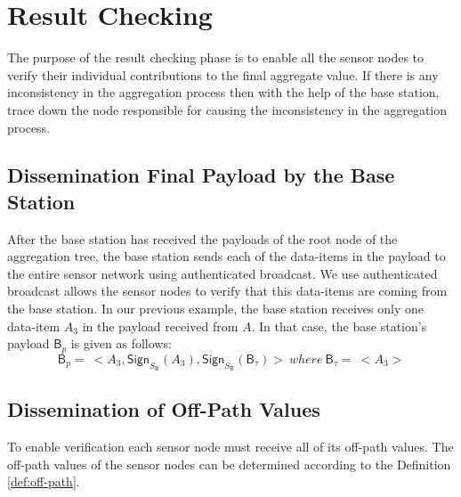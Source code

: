 \section{Result Checking}
	The purpose of the result checking phase is to enable all the sensor nodes to verify their individual contributions to the final aggregate value.
	If there is any inconsistency in the aggregation process then with the help of the base station, trace down the node responsible for causing the inconsistency in the aggregation process.

	\subsection{Dissemination Final Payload by the Base Station}
		After the base station has received the payloads of the root node of the aggregation tree, the base station sends each of the data-items in the payload to the entire sensor network using authenticated broadcast.
		We use authenticated broadcast allows the sensor nodes to verify that this data-items are coming from the base station.
		In our previous example, the base station receives only one data-item $A_{3}$ in the payload received from $A$.
		In that case, the base station's payload $\textsf{B}_{p}$ is given as follows:
 		\begin{equation}
			\textsf{B}_{p} =\ <A_{3}, \textsf{Sign}_{S_{\textsf{B}}}(A_{3}), \textsf{Sign}_{S_{\textsf{B}}}(\textsf{B}_{\tau})>\ where\ \textsf{B}_{\tau} =\ <A_{3}>
		\end{equation}

	\subsection{Dissemination of Off-Path Values}
		To enable verification each sensor node must receive all of its off-path values.
		The off-path values of the sensor nodes can be determined according to the Definition \ref{def:off-path}.
		
